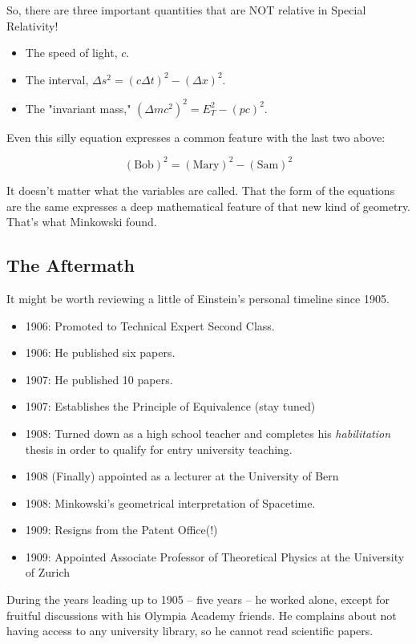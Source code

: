 \documentclass[
]{article}
\begin{document}
So, there are three important quantities that are NOT relative in
Special Relativity!

\begin{itemize}
\item
  The speed of light, \(c\).
\item
  The interval, \(\Delta s^2 = (c\Delta t)^2 - (\Delta x)^2\).
\item
  The "invariant mass," \((\Delta mc^2)^2 = E_T^2 - (pc)^2\).
\end{itemize}

Even this silly equation expresses a common feature with the last two
above:

\[(\text{Bob})^2 = (\text{Mary})^2 - (\text{Sam})^2 \nonumber\]

It doesn't matter what the variables are called. That the form of the
equations are the same expresses a deep mathematical feature of that new
kind of geometry. That's what Minkowski found.

\hypertarget{the-aftermath}{%
\subsection{The Aftermath}\label{the-aftermath}}

It might be worth reviewing a little of Einstein's personal timeline
since 1905.

\begin{itemize}
\item
  1906: Promoted to Technical Expert Second Class.
\item
  1906: He published six papers.
\item
  1907: He published 10 papers.
\item
  1907: Establishes the Principle of Equivalence (stay tuned)
\item
  1908: Turned down as a high school teacher and completes his
  \emph{habilitation} thesis in order to qualify for entry university
  teaching.
\item
  1908 (Finally) appointed as a lecturer at the University of Bern
\item
  1908: Minkowski's geometrical interpretation of Spacetime.
\item
  1909: Resigns from the Patent Office(!)
\item
  1909: Appointed Associate Professor of Theoretical Physics at the
  University of Zurich
\end{itemize}

During the years leading up to 1905 -- five years -- he worked alone,
except for fruitful discussions with his Olympia Academy friends. He
complains about not having access to any university library, so he
cannot read scientific papers.
\end{document}
